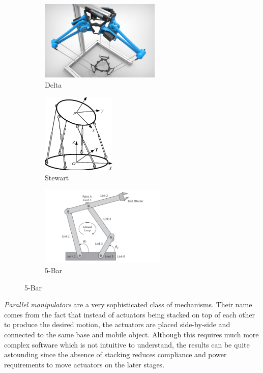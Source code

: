 \begin{figure}[H]
	\begin{subfigure}[b]{.4\linewidth}
	\includegraphics[height=1.5in]{imgs/delta_platform.jpeg}
	\caption{Delta}
	\end{subfigure}\begin{subfigure}[b]{.28\linewidth}
	\includegraphics[height=1.5in]{imgs/stewart_platform.png}
	\caption{Stewart}
	\end{subfigure}\begin{subfigure}[b]{.28\linewidth}
	\includegraphics[height=1.5in]{imgs/5bar_platform.png}
	\caption{5-Bar}
	\end{subfigure}
\end{figure}

\textit{Parallel manipulators} are a very sophisticated class of mechanisms. Their name comes from the fact that instead of actuators being stacked on top of each other to produce the desired motion, the actuators are placed side-by-side and connected to the same base and mobile object. Although this requires much more complex software which is not intuitive to understand, the results can be quite astounding since the absence of stacking reduces compliance and power requirements to move actuators on the later stages.

